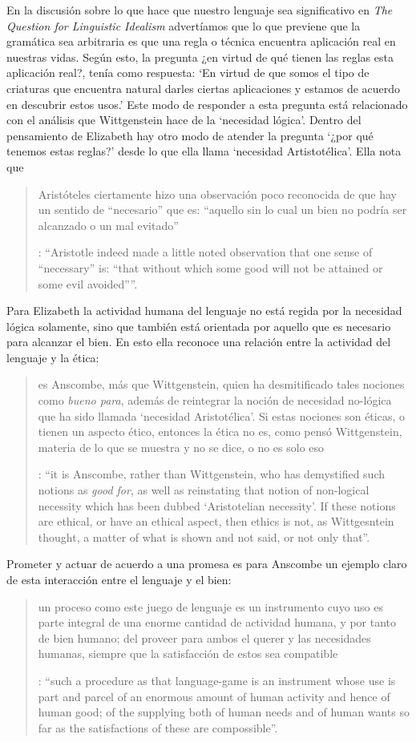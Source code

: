 \label{subsec:logicbien}
En la discusión sobre lo que hace que nuestro lenguaje sea significativo en \emph{The Question for Linguistic Idealism} advertíamos que lo que previene que la gramática sea arbitraria es que una regla o técnica encuentra aplicación real en nuestras vidas. Según esto, la pregunta ¿en virtud de qué tienen las reglas esta aplicación real?, tenía como respuesta: \enquote*{En virtud de que somos el tipo de criaturas que encuentra natural darles ciertas aplicaciones y estamos de acuerdo en descubrir estos usos.} Este modo de responder a esta pregunta está relacionado con el análisis que Wittgenstein hace de la `necesidad lógica'. Dentro del pensamiento de Elizabeth hay otro modo de atender la pregunta \enquote*{¿por qué tenemos estas reglas?} desde lo que ella llama `necesidad Artistotélica'. Ella nota que \blockquote[{\Cite[100]{anscombe1981erp:rrp}}: \enquote{Aristotle indeed made a little noted observation that one sense of ``necessary'' is: ``that without which some good will not be attained or some evil avoided''}.]{Aristóteles ciertamente hizo una observación poco reconocida de que hay un sentido de ``necesario'' que es: ``aquello sin lo cual un bien no podría ser alcanzado o un mal evitado''}. Para Elizabeth la actividad humana del lenguaje no está regida por la necesidad lógica solamente, sino que también está orientada por aquello que es necesario para alcanzar el bien. En esto ella reconoce una relación entre la actividad del lenguaje y la ética: \blockquote[{\Cite[221]{teichmann2008ans}}: \enquote{it is Anscombe, rather than Wittgenstein, who has demystified such notions as \emph{good for}, as well as reinstating that notion of non-logical necessity which has been dubbed `Aristotelian necessity'. If these notions are ethical, or have an ethical aspect, then ethics is not, as Wittgesntein thought, a matter of what is shown and not said, or not only that}.]{es Anscombe, más que Wittgenstein, quien ha desmitificado tales nociones como \emph{bueno para}, además de reintegrar la noción de necesidad no-lógica que ha sido llamada `necesidad Aristotélica'. Si estas nociones son éticas, o tienen un aspecto ético, entonces la ética no es, como pensó Wittgenstein, materia de lo que se muestra y no se dice, o no es solo eso}. Prometer y actuar de acuerdo a una promesa es para Anscombe un ejemplo claro de esta interacción entre el lenguaje y el bien: \blockquote[{\Cite[18]{anscombe1981erp:pj}}: \enquote{such a procedure as that language-game is an instrument whose use is part and parcel of an enormous amount of human activity and hence of human good; of the supplying both of human needs and of human wants so far as the satisfactions of these are compossible}.]{un proceso como este juego de lenguaje es un instrumento cuyo uso es parte integral de una enorme cantidad de actividad humana, y por tanto de bien humano; del proveer para ambos el querer y las necesidades humanas, siempre que la satisfacción de estos sea compatible}.


